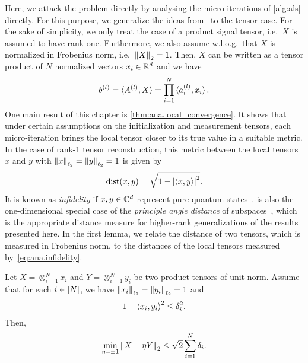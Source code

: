 Here, we attack the problem directly by analysing the micro-iterations of \cref{alg:als} directly.
For this purpose, we generalize the ideas from~\cite{Zhong_2015_Efficient} to the tensor case.
For the sake of simplicity, we only treat the case of a product signal tensor, i.e.\ $X$ is assumed to have rank one.
Furthermore, we also assume w.l.o.g.\ that $X$ is normalized in Frobenius norm, i.e.\ ${\Vert X\Vert}_2 = 1$.
Then, $X$ can be written as a tensor product of $N$ normalized vectors $x_i \in {\mathbb{R}}^d$ and we have
\[
  b^{(l)} = \braket{A^{(l)}, X} = \prod_{i=1}^N \braket{a^{(l)}_i, x_i}.
  \label{eq:ana.b_as_product}
\]
One main result of this chapter is \cref{thm:ana.local_convergence}.
It shows that under certain assumptions on the initialization and measurement tensors, each micro-iteration brings the local tensor closer to its true value in a suitable metric.
In the case of rank-1 tensor reconstruction, this metric between the local tensors $x$ and $y$ with ${\Vert x\Vert}_{\ell_2} = {\Vert y\Vert}_{\ell_2} = 1$ is given by
\[
  \mathrm{dist}(x, y) = \sqrt{1 - {\left\vert\braket{x, y}\right\vert}^2}.
  \label{eq:ana.infidelity}
\]
It is known as \emph{infidelity} if $x, y \in {\mathbb{C}}^d$ represent pure quantum states~\cite{Nielsen_2010_Quantum}.
 is also the one-dimensional special case of the \emph{principle angle distance} of subspaces~\cite{Golub_2013_Matrix}, which is the appropriate distance measure for higher-rank generalizations of the results presented here.
In the first lemma, we relate the  distance of two tensors, which is measured in Frobenius norm, to the distances of the local tensors measured by~\eqref{eq:ana.infidelity}.
\begin{lemma}%
  \label{lem:ana.local_global_closeness}
  Let $X = \otimes_{i=1}^N x_i$ and $Y = \otimes_{i=1}^N y_i$ be two product tensors of unit norm.
  Assume that for each $i \in [N]$, we have ${\Vert x_i\Vert}_{\ell_2} = {\Vert y_i\Vert}_{\ell_2} = 1$ and
  \[
    \label{eq:ana.local_global_closeness.local_close}
    1 - \Braket{x_i, y_i}^2 \le \delta_i^2.
  \]
  Then,
  \[
    \min_{\eta = \pm 1} {\left\Vert X - \eta Y\right\Vert}_{2} \le \sqrt{2} \sum_{i=1}^N \delta_i.
  \]
\end{lemma}
